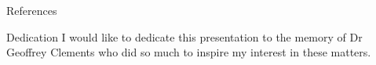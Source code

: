 \documentclass[final]{beamer}
\newlength{\sepwidth}
\newlength{\colwidth}
\newcommand{\separatorcolumn}{\begin{column}{\sepwidth}\end{column}}
\begin{document}
\begin{frame}[t]
\begin{columns}[t]
\begin{column}{\colwidth}
  \begin{block}{References}
    \printbibliography
  \end{block}
\begin{block}{Dedication}
I would like to dedicate this presentation to the memory of Dr Geoffrey Clements who did so much to inspire my interest in these matters. 
\end{block}
\end{column}

\separatorcolumn
\end{columns}
\end{frame}
\end{document}
